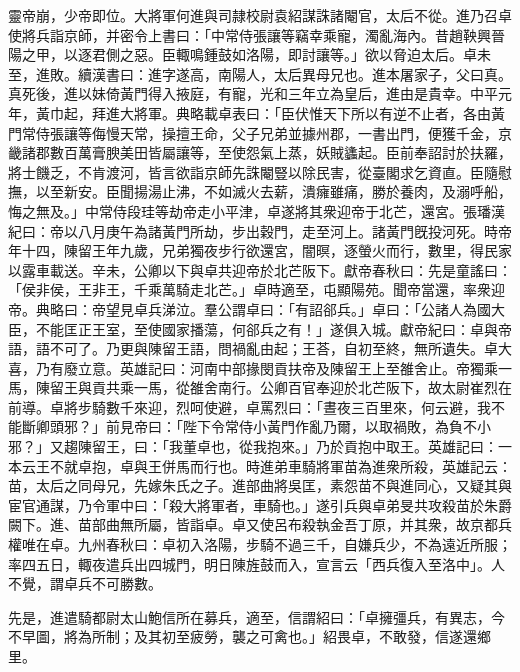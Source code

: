 \begin{pinyinscope}
靈帝崩，少帝即位。大將軍何進與司隷校尉袁紹謀誅諸閹官，太后不從。進乃召卓使將兵詣京師，并密令上書曰：「中常侍張讓等竊幸乘寵，濁亂海內。昔趙鞅興晉陽之甲，以逐君側之惡。臣輙鳴鍾鼓如洛陽，即討讓等。」欲以脅迫太后。卓未至，進敗。續漢書曰：進字遂高，南陽人，太后異母兄也。進本屠家子，父曰真。真死後，進以妹倚黃門得入掖庭，有寵，光和三年立為皇后，進由是貴幸。中平元年，黃巾起，拜進大將軍。典略載卓表曰：「臣伏惟天下所以有逆不止者，各由黃門常侍張讓等侮慢天常，操擅王命，父子兄弟並據州郡，一書出門，便獲千金，京畿諸郡數百萬膏腴美田皆屬讓等，至使怨氣上蒸，妖賊蠭起。臣前奉詔討於扶羅，將士饑乏，不肯渡河，皆言欲詣京師先誅閹豎以除民害，從臺閣求乞資直。臣隨慰撫，以至新安。臣聞揚湯止沸，不如滅火去薪，潰癕雖痛，勝於養肉，及溺呼船，悔之無及。」中常侍段珪等劫帝走小平津，卓遂將其衆迎帝于北芒，還宮。張璠漢紀曰：帝以八月庚午為諸黃門所劫，步出穀門，走至河上。諸黃門旣投河死。時帝年十四，陳留王年九歲，兄弟獨夜步行欲還宮，闇暝，逐螢火而行，數里，得民家以露車載送。辛未，公卿以下與卓共迎帝於北芒阪下。獻帝春秋曰：先是童謠曰：「侯非侯，王非王，千乘萬騎走北芒。」卓時適至，屯顯陽苑。聞帝當還，率衆迎帝。典略曰：帝望見卓兵涕泣。羣公謂卓曰：「有詔郤兵。」卓曰：「公諸人為國大臣，不能匡正王室，至使國家播蕩，何郤兵之有！」遂俱入城。獻帝紀曰：卓與帝語，語不可了。乃更與陳留王語，問禍亂由起；王荅，自初至終，無所遺失。卓大喜，乃有廢立意。英雄記曰：河南中部掾閔貢扶帝及陳留王上至雒舍止。帝獨乘一馬，陳留王與貢共乘一馬，從雒舍南行。公卿百官奉迎於北芒阪下，故太尉崔烈在前導。卓將步騎數千來迎，烈呵使避，卓罵烈曰：「晝夜三百里來，何云避，我不能斷卿頭邪？」前見帝曰：「陛下令常侍小黃門作亂乃爾，以取禍敗，為負不小邪？」又趨陳留王，曰：「我董卓也，從我抱來。」乃於貢抱中取王。英雄記曰：一本云王不就卓抱，卓與王併馬而行也。時進弟車騎將軍苗為進衆所殺，英雄記云：苗，太后之同母兄，先嫁朱氏之子。進部曲將吳匡，素怨苗不與進同心，又疑其與宦官通謀，乃令軍中曰：「殺大將軍者，車騎也。」遂引兵與卓弟旻共攻殺苗於朱爵闕下。進、苗部曲無所屬，皆詣卓。卓又使呂布殺執金吾丁原，并其衆，故京都兵權唯在卓。九州春秋曰：卓初入洛陽，步騎不過三千，自嫌兵少，不為遠近所服；率四五日，輙夜遣兵出四城門，明日陳旌鼓而入，宣言云「西兵復入至洛中」。人不覺，謂卓兵不可勝數。

先是，進遣騎都尉太山鮑信所在募兵，適至，信謂紹曰：「卓擁彊兵，有異志，今不早圖，將為所制；及其初至疲勞，襲之可禽也。」紹畏卓，不敢發，信遂還鄉里。


\end{pinyinscope}
